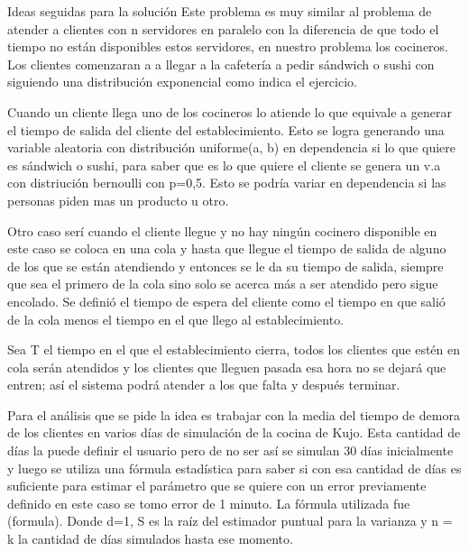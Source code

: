 \documentclass[]{article}
\begin{document}
\begin{section} {Ideas seguidas para la soluci\'{o}n}
Este problema es muy similar al problema de atender a clientes con n servidores en paralelo con la diferencia de que todo el tiempo no est\'{a}n disponibles estos servidores, en nuestro problema los cocineros. Los clientes comenzaran a a llegar a la cafeter\'{i}a a pedir s\'{a}ndwich o sushi con siguiendo una distribuci\'{o}n exponencial como indica el ejercicio.

Cuando un cliente llega uno de los cocineros lo atiende lo que equivale a generar el tiempo de salida del cliente del establecimiento. Esto se logra generando una variable aleatoria con distribuci\'{o}n uniforme(a, b) en dependencia si lo que quiere es s\'{a}ndwich o sushi, para saber que es lo que quiere el cliente se genera un v.a con distriuci\'{o}n bernoulli con p=0,5. Esto se podría variar en dependencia si las personas piden mas un producto u otro. 

Otro caso ser\'{i} cuando el cliente llegue y no hay ning\'{u}n cocinero disponible en este caso se coloca en una cola y hasta que llegue el tiempo de salida de alguno de los que se están atendiendo y entonces se le da su tiempo de salida, siempre que sea el primero de la cola sino solo se acerca m\'{a}s a ser atendido pero sigue encolado. Se defini\'{o} el tiempo de espera del cliente como el tiempo en que sali\'{o} de la cola menos el tiempo en el que llego al establecimiento.

Sea T el tiempo en el que el establecimiento cierra, todos los clientes que est\'{e}n en cola ser\'{a}n atendidos y los clientes que lleguen pasada esa hora no se dejar\'{a} que entren; as\'{i} el sistema podr\'{a} atender a los que falta y despu\'{e}s terminar.

Para el an\'{a}lisis que se pide la idea es trabajar con la media del tiempo de demora de los clientes en varios d\'{i}as de simulaci\'{o}n de la cocina de Kujo. Esta cantidad de d\'{i}as la puede definir el usuario pero de no ser así se simulan 30 días inicialmente y luego se utiliza una f\'{o}rmula estad\'{i}stica para saber si con esa cantidad de d\'{i}as es suficiente para estimar el par\'{a}metro que se quiere con un error previamente definido en este caso se tomo error de 1 minuto. La f\'{o}rmula utilizada fue (formula). Donde d=1, S es la ra\'{i}z del estimador puntual para la varianza y n = k la cantidad de d\'{i}as simulados hasta ese momento.    

\end{section}
                 
\end{document}
